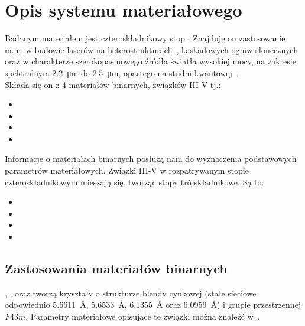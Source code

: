\documentclass[12pt,openany,a4paper]{book}
\begin{document}
	
	\let\cleardoublepage\clearpage
	{\hypersetup{linkcolor=black}
		\tableofcontents{}
		\listoffigures{}
	}
	
	\mainmatter{}
	
	
	\chapter{Opis systemu materiałowego}\label{chapt:opis}
	
	Badanym materiałem jest czteroskładnikowy stop . Znajduję on zastosowanie m.in. w budowie
	laserów na heterostrukturach~\autocite{Morosini1993}, kaskadowych ogniw słonecznych~\autocite{Timmons1981} oraz
	w charakterze szerokopasmowego źródła światła wysokiej mocy, na zakresie spektralnym \SI{2.2}{\micro\metre} do \SI{2.5}{\micro\metre},
	opartego na studni kwantowej~\autocite{Wootten2014}.\\

	Składa się on z 4 materiałów binarnych, związków III-V tj.:
	\begin{itemize}
		\item {}
		\item {}
		\item {}
		\item {}
	\end{itemize} 
	Informacje o materiałach binarnych posłużą nam do wyznaczenia podstawowych parametrów materiałowych.
	Związki III-V w rozpatrywanym stopie czteroskładnikowym mieszają się, tworząc stopy trójskładnikowe.
	Są to:
	\begin{itemize}
		\item {}
		\item {}
		\item {}
		\item {}
	\end{itemize}
	
	\section{Zastosowania materiałów binarnych}
	, ,  oraz  tworzą kryształy o strukturze blendy cynkowej (stałe sieciowe odpowiednio \SI{5.6611}{\angstrom}, \SI{5.6533}{\angstrom}, \SI{6.1355}{\angstrom} oraz \SI{6.0959}{\angstrom}) i grupie przestrzennej
	\(F\overline{4}3m\). Parametry materiałowe opisujące te związki można znaleźć w~\textcite{Adachi1985,Vurgaftman2001,Adachi1989,Adachi2017}.
\end{document}
